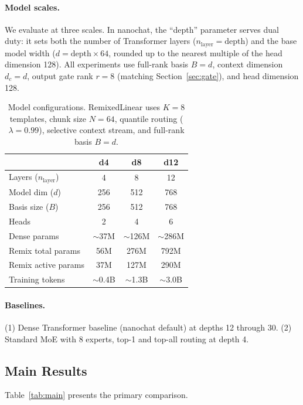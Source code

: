 \documentclass{article}
\begin{document}
\paragraph{Model scales.} We evaluate at three scales. In nanochat, the ``depth'' parameter serves dual duty: it sets both the number of Transformer layers ($n_\text{layer} = \text{depth}$) and the base model width ($d = \text{depth} \times 64$, rounded up to the nearest multiple of the head dimension 128). All experiments use full-rank basis $B = d$, context dimension $d_c = d$, output gate rank $r = 8$ (matching Section~\ref{sec:gate}), and head dimension 128.

\begin{table}[t]
\centering
\small
\caption{Model configurations. RemixedLinear uses $K{=}8$ templates, chunk size $N{=}64$, quantile routing ($\lambda{=}0.99$), selective context stream, and full-rank basis $B{=}d$.}
\label{tab:configs}
\begin{tabular}{@{}lccc@{}}
\toprule
& \textbf{d4} & \textbf{d8} & \textbf{d12} \\
\midrule
Layers ($n_\text{layer}$) & 4 & 8 & 12 \\
Model dim ($d$) & 256 & 512 & 768 \\
Basis size ($B$) & 256 & 512 & 768 \\
Heads & 2 & 4 & 6 \\
Dense params & $\sim$37M & $\sim$126M & $\sim$286M \\
Remix total params & 56M & 276M & 792M \\
Remix active params & 37M & 127M & 290M \\
Training tokens & $\sim$0.4B & $\sim$1.3B & $\sim$3.0B \\
\bottomrule
\end{tabular}
\end{table}

\paragraph{Baselines.} (1) Dense Transformer baseline (nanochat default) at depths 12 through 30. (2) Standard MoE with 8 experts, top-1 and top-all routing at depth 4.

\subsection{Main Results}

Table~\ref{tab:main} presents the primary comparison.
\end{document}
